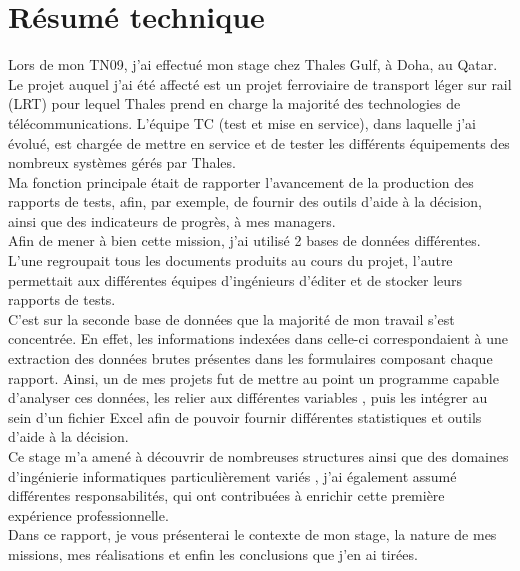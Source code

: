 \chapter*{Résumé technique}

Lors de mon TN09, j'ai effectué mon stage chez Thales Gulf, à Doha, au Qatar. Le projet auquel j'ai été affecté est un projet ferroviaire de transport léger sur rail (\gls{LRT}) pour lequel Thales prend en charge la majorité des technologies de télécommunications. L'équipe \gls{TC} (test et mise en service), dans laquelle j'ai évolué, est chargée de mettre en service et de tester les différents équipements des nombreux systèmes gérés par Thales. \\
Ma fonction principale était de rapporter l'avancement de la production des rapports de tests, afin, par exemple, de fournir des outils d'aide à la décision, ainsi que des indicateurs de progrès, à mes managers. \\
Afin de mener à bien cette mission, j'ai utilisé 2 bases de données différentes. L'une regroupait tous les documents produits au cours du projet, l'autre permettait aux différentes équipes d'ingénieurs d'éditer et de stocker leurs rapports de tests. \\
C'est sur la seconde base de données que la majorité de mon travail s'est concentrée. En effet, les informations indexées dans celle-ci correspondaient à une extraction des données brutes présentes dans les formulaires composant chaque rapport. Ainsi, un de mes projets fut de mettre au point un programme capable d'analyser ces données, les relier aux différentes variables , puis les intégrer au sein d'un fichier Excel afin de pouvoir fournir différentes statistiques et outils d'aide à la décision.\\
Ce stage m'a amené à découvrir de nombreuses structures ainsi que des domaines d'ingénierie informatiques particulièrement variés , j'ai également assumé différentes responsabilités, qui ont contribuées à enrichir cette première expérience professionnelle. \\
Dans ce rapport, je vous présenterai le contexte de mon stage, la nature de mes missions, mes réalisations et enfin les conclusions que j'en ai tirées.
